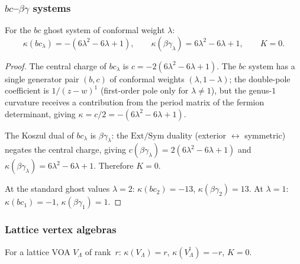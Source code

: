 \subsubsection{\texorpdfstring{$bc$--$\beta\gamma$}{bc-betagamma} systems}

\begin{proposition}
\label{prop:thqg-IV-bc-bg-K}
For the $bc$ ghost system of conformal weight $\lambda$:
\begin{equation}\label{eq:thqg-IV-bc-bg-K}
\kappa(bc_\lambda) = -(6\lambda^2 - 6\lambda + 1),
\qquad
\kappa(\beta\gamma_\lambda) = 6\lambda^2 - 6\lambda + 1,
\qquad
K = 0.
\end{equation}
\end{proposition}

\begin{proof}
The central charge of $bc_\lambda$ is $c = -2(6\lambda^2 - 6\lambda + 1)$.
The $bc$ system has a single generator pair $(b, c)$ of conformal weights
$(\lambda, 1 - \lambda)$; the double-pole coefficient is $1/(z-w)^1$
(first-order pole only for $\lambda \neq 1$), but the genus-$1$
curvature receives a contribution from the period matrix of the
fermion determinant, giving $\kappa = c/2 = -(6\lambda^2 - 6\lambda + 1)$.

The Koszul dual of $bc_\lambda$ is $\beta\gamma_\lambda$: the
$\mathrm{Ext}/\mathrm{Sym}$ duality (exterior $\leftrightarrow$
symmetric) negates the central charge, giving
$c(\beta\gamma_\lambda) = 2(6\lambda^2 - 6\lambda + 1)$ and
$\kappa(\beta\gamma_\lambda) = 6\lambda^2 - 6\lambda + 1$.
Therefore $K = 0$.

At the standard ghost values $\lambda = 2$: $\kappa(bc_2) = -13$,
$\kappa(\beta\gamma_2) = 13$.
At $\lambda = 1$: $\kappa(bc_1) = -1$, $\kappa(\beta\gamma_1) = 1$.
\end{proof}

\subsubsection{Lattice vertex algebras}

\begin{proposition}
\label{prop:thqg-IV-lattice-K}
For a lattice VOA $V_\Lambda$ of rank~$r$:
$\kappa(V_\Lambda) = r$, $\kappa(V_\Lambda^!) = -r$, $K = 0$.
\end{proposition}

